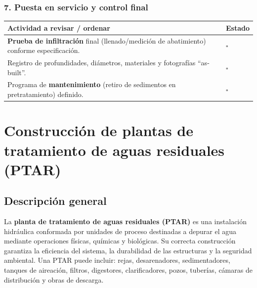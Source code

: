 \documentclass[12pt]{article}
\newcommand{\cbox}{\(\square\)}
\renewcommand{\cbox}{\(\square\)} %
\begin{document}
	\subsubsection*{7. Puesta en servicio y control final}
	\begin{tabularx}{\linewidth}{>{\raggedright\arraybackslash}p{0.93\linewidth} >{\centering\arraybackslash}m{0.07\linewidth}}
		\toprule
		\textbf{Actividad a revisar / ordenar} & \textbf{Estado}\\
		\midrule
		\textbf{Prueba de infiltración} final (llenado/medición de abatimiento) conforme especificación. & \cbox \\
		Registro de profundidades, diámetros, materiales y fotografías “as-built”. & \cbox \\
		Programa de \textbf{mantenimiento} (retiro de sedimentos en pretratamiento) definido. & \cbox \\
		\bottomrule
	\end{tabularx}
	
	
	
	
	
	
	
	\section{Construcción de plantas de tratamiento de aguas residuales (PTAR)}
	
	\subsection*{Descripción general}
	La \textbf{planta de tratamiento de aguas residuales (PTAR)} es una instalación hidráulica conformada por unidades de proceso destinadas a depurar el agua mediante operaciones físicas, químicas y biológicas.  
	Su correcta construcción garantiza la eficiencia del sistema, la durabilidad de las estructuras y la seguridad ambiental.  
	Una PTAR puede incluir: rejas, desarenadores, sedimentadores, tanques de aireación, filtros, digestores, clarificadores, pozos, tuberías, cámaras de distribución y obras de descarga.
	
\end{document}
